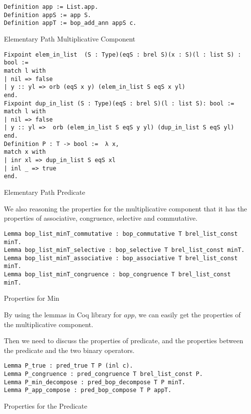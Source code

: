 \begin{listing}[H]
\begin{verbatim}
Definition app := List.app.
Definition appS := app S.
Definition appT := bop_add_ann appS c.
\end{verbatim}
\caption{Elementary Path Multiplicative Component} 
\label{coq:def:elementary_path_app}
\end{listing}

\begin{listing}[H]
\begin{verbatim}
Fixpoint elem_in_list  (S : Type)(eqS : brel S)(x : S)(l : list S) : bool :=
match l with
| nil => false
| y :: yl => orb (eqS x y) (elem_in_list S eqS x yl)
end.
Fixpoint dup_in_list (S : Type)(eqS : brel S)(l : list S): bool :=
match l with
| nil => false
| y :: yl =>  orb (elem_in_list S eqS y yl) (dup_in_list S eqS yl)
end.
Definition P : T -> bool :=  λ x,
match x with
| inr xl => dup_in_list S eqS xl
| inl _ => true
end.
\end{verbatim}
\caption{Elementary Path Predicate} 
\label{coq:def:elementary_path_predicate}
\end{listing}

We also reasoning the properties for the multiplicative component that it has the properties of associative, congruence, selective and commutative.
\begin{listing}[H]
\begin{verbatim}
Lemma bop_list_minT_commutative : bop_commutative T brel_list_const minT.
Lemma bop_list_minT_selective : bop_selective T brel_list_const minT.
Lemma bop_list_minT_associative : bop_associative T brel_list_const minT.
Lemma bop_list_minT_congruence : bop_congruence T brel_list_const minT.
\end{verbatim}
\caption{Properties for Min} 
\label{coq:proof:elementary_path_min}
\end{listing}
By using the lemmas in Coq library for $app$, we can easily get the properties of the multiplicative component.

Then we need to discuss the properties of predicate, and the properties between the predicate and the two binary operators.
\begin{listing}[H]
\begin{verbatim}
Lemma P_true : pred_true T P (inl c).
Lemma P_congruence : pred_congruence T brel_list_const P.
Lemma P_min_decompose : pred_bop_decompose T P minT.
Lemma P_app_compose : pred_bop_compose T P appT.
\end{verbatim}
\caption{Properties for the Predicate} 
\label{coq:proof:predicate_properties}
\end{listing}


